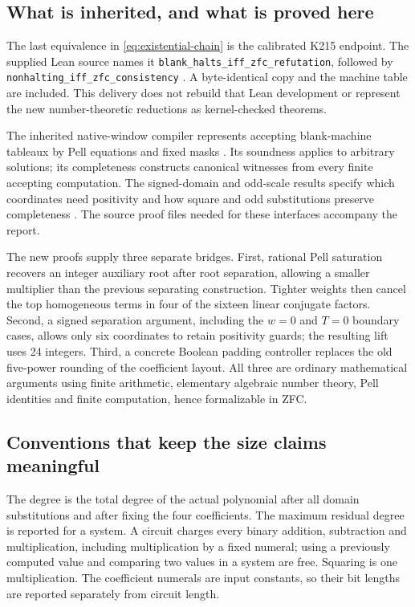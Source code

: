 \documentclass[11pt,letterpaper]{article}
\theoremstyle{remark}
\begin{document}
\subsection{What is inherited, and what is proved here}

The last equivalence in \eqref{eq:existential-chain} is the calibrated
K215 endpoint.  The supplied Lean source names it
\texttt{blank\_halts\_iff\_zfc\_refutation}, followed by
\texttt{nonhalting\_iff\_zfc\_consistency} \cite{K215}.  A byte-identical
copy and the machine table are included.  This delivery does not rebuild
that Lean development or represent the new number-theoretic reductions
as kernel-checked theorems.

The inherited native-window compiler represents accepting blank-machine
tableaux by Pell equations and fixed masks
\cite{baseline67,normalized,wang}.  Its soundness applies to arbitrary
solutions; its completeness constructs canonical witnesses from every
finite accepting computation.  The signed-domain and odd-scale results
specify which coordinates need positivity and how square and odd
substitutions preserve completeness \cite{normalized,oddscale}.
The source proof files needed for these interfaces accompany the report.

The new proofs supply three separate bridges.  First, rational Pell
saturation recovers an integer auxiliary root after root separation,
allowing a smaller multiplier than the previous separating construction.
Tighter weights then cancel the top homogeneous terms in four of the
sixteen linear conjugate factors.  Second, a signed separation argument,
including the $w=0$ and $T=0$ boundary cases, allows only six coordinates
to retain positivity guards; the resulting lift uses 24 integers.
Third, a concrete Boolean padding controller replaces the old
five-power rounding of the coefficient layout.  All three are ordinary
mathematical arguments using finite arithmetic, elementary algebraic
number theory, Pell identities and finite computation, hence formalizable
in ZFC.

\subsection{Conventions that keep the size claims meaningful}

The degree is the total degree of the actual polynomial after all domain
substitutions and after fixing the four coefficients.  The maximum
residual degree is reported for a system.  A circuit charges every binary
addition, subtraction and multiplication, including multiplication by a
fixed numeral; using a previously computed value and comparing two
values in a system are free.  Squaring is one multiplication.  The
coefficient numerals are input constants, so their bit lengths are
reported separately from circuit length.
\end{document}
